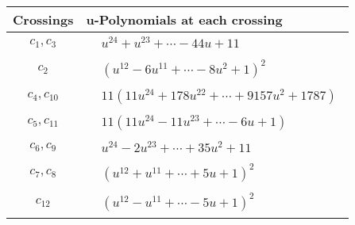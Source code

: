 \documentclass[1p]{elsarticle_modified}
\theoremstyle{definition}
\begin{document}
\begin{tabular}{m{50pt}|m{274pt}}
Crossings & \hspace{64pt}u-Polynomials at each crossing \\
\hline $$\begin{aligned}c_{1},c_{3}\end{aligned}$$&$\begin{aligned}
&u^{24}+u^{23}+\cdots-44 u+11
\end{aligned}$\\
\hline $$\begin{aligned}c_{2}\end{aligned}$$&$\begin{aligned}
&(u^{12}-6 u^{11}+\cdots-8 u^2+1)^{2}
\end{aligned}$\\
\hline $$\begin{aligned}c_{4},c_{10}\end{aligned}$$&$\begin{aligned}
&11(11 u^{24}+178 u^{22}+\cdots+9157 u^2+1787)
\end{aligned}$\\
\hline $$\begin{aligned}c_{5},c_{11}\end{aligned}$$&$\begin{aligned}
&11(11 u^{24}-11 u^{23}+\cdots-6 u+1)
\end{aligned}$\\
\hline $$\begin{aligned}c_{6},c_{9}\end{aligned}$$&$\begin{aligned}
&u^{24}-2 u^{23}+\cdots+35 u^2+11
\end{aligned}$\\
\hline $$\begin{aligned}c_{7},c_{8}\end{aligned}$$&$\begin{aligned}
&(u^{12}+u^{11}+\cdots+5 u+1)^{2}
\end{aligned}$\\
\hline $$\begin{aligned}c_{12}\end{aligned}$$&$\begin{aligned}
&(u^{12}- u^{11}+\cdots-5 u+1)^{2}
\end{aligned}$\\
\hline
\end{tabular}\\~\\
\end{document}
